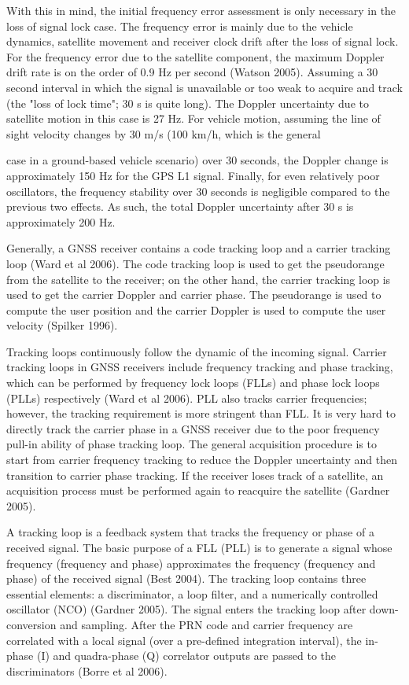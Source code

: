 With this in mind, the initial frequency error assessment is only necessary in the loss of signal lock case. The frequency error is mainly due to the vehicle dynamics, satellite movement and receiver clock drift after the loss of signal lock. For the frequency error due to the satellite component, the maximum Doppler drift rate is on the order of 0.9 Hz per second (Watson 2005). Assuming a 30 second interval in which the signal is unavailable or too weak to acquire and track (the "loss of lock time"; 30 s is quite long). The Doppler uncertainty due to satellite motion in this case is 27 Hz. For vehicle motion, assuming the line of sight velocity changes by 30 m/s (100 km/h, which is the general


case in a ground-based vehicle scenario) over 30 seconds, the Doppler change is approximately 150 Hz for the GPS L1 signal. Finally, for even relatively poor oscillators,
the frequency stability over 30 seconds is negligible compared to the previous two effects. As such, the total Doppler uncertainty after 30 s is approximately 200 Hz.



Generally, a GNSS receiver contains a code tracking loop and a carrier tracking loop (Ward et al 2006). The code tracking loop is used to get the pseudorange from the satellite to the receiver; on the other hand, the carrier tracking loop is used to get the carrier Doppler and carrier phase. The pseudorange is used to compute the user position and the carrier Doppler is used to compute the user velocity (Spilker 1996).



Tracking loops continuously follow the dynamic of the incoming signal. Carrier tracking loops in GNSS receivers include frequency tracking and phase tracking, which can be performed by frequency lock loops (FLLs) and phase lock loops (PLLs) respectively (Ward et al 2006). PLL also tracks carrier frequencies; however, the tracking requirement is more stringent than FLL. It is very hard to directly track the carrier phase in a GNSS receiver due to the poor frequency pull-in ability of phase tracking loop. The general acquisition procedure is to start from carrier frequency tracking to reduce the Doppler uncertainty and then transition to carrier phase tracking. If the receiver loses track of a satellite, an acquisition process must be performed again to reacquire the satellite (Gardner 2005).


A tracking loop is a feedback system that tracks the frequency or phase of a received signal. The basic purpose of a FLL (PLL) is to generate a signal whose frequency (frequency and phase) approximates the frequency (frequency and phase) of the received signal (Best 2004). The tracking loop contains three essential elements: a discriminator, a loop filter, and a numerically controlled oscillator (NCO) (Gardner 2005). The signal enters the tracking loop after down-conversion and sampling. After the PRN code and carrier frequency are correlated with a local signal (over a pre-defined integration interval), the in-phase (I) and quadra-phase (Q) correlator outputs are passed to the discriminators (Borre et al 2006). 

